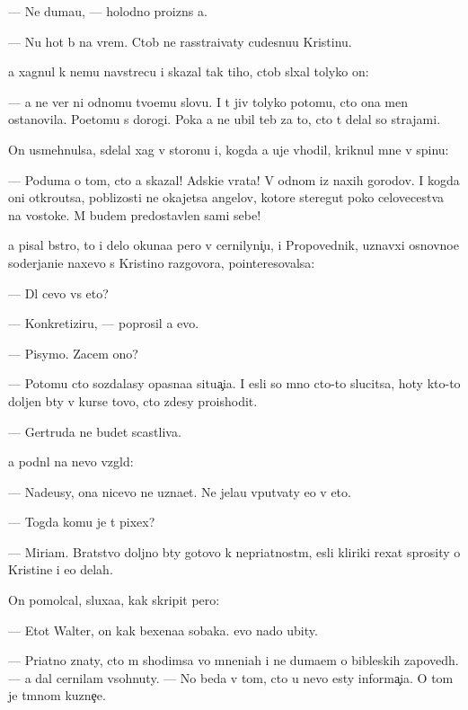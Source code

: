 \documentclass[10pt]{book}
\begin{document}
— Ne duma{\y}u, — holodno proizn{\e}s {\y}a.

— Nu hot{\ia} b{\yi} na vrem{\ia}. Ctob{\yi} ne rasstra{\y}ivaty cudesnu{\y}u Kristinu.

{\Y}a xagnul k nemu navstrecu i skazal tak tiho, ctob{\yi} sl{\yi}xal tolyko on:

— {\Y}a ne ver{\iu} ni odnomu tvo{\y}emu slovu. I t{\yi} jiv tolyko potomu, cto ona men{\ia} ostanovila. Poetomu s dorogi. Poka {\y}a ne ubil teb{\ia} za to, cto t{\yi} delal so strajami.

On usmehnulsa, sdelal xag v storonu i, kogda {\y}a uje v{\yi}hodil, kriknul mne v spinu:

— Poduma{\y} o tom, cto {\y}a skazal! Adski{\y}e vrata! V odnom iz naxih gorodov. I kogda oni otkro{\y}utsa, poblizosti ne okajetsa angelov, kotor{\yi}{\y}e steregut poko{\y} celovecestva na vostoke. M{\yi} budem predostavlen{\yi} sami sebe!



{\Y}a pisal b{\yi}stro, to i delo okuna{\y}a pero v cernilyni{\c}u, i Propovednik, uznavxi{\y} osnovno{\y}e soderjani{\y}e naxevo s Kristino{\y} razgovora, pointeresovalsa:

— Dl{\ia} cevo vs{\e} eto?

— Konkretiziru{\y}, — poprosil {\y}a {\y}evo.

— Pisymo. Zacem ono?

— Potomu cto sozdalasy opasna{\y}a situa{\c}i{\y}a. I {\y}esli so mno{\y} cto-to slucitsa, hoty kto-to doljen b{\yi}ty v kurse tovo, cto zdesy proishodit.

— Gertruda ne budet scastliva.

{\Y}a podn{\ia}l na nevo vzgl{\ia}d:

— Nade{\y}usy, ona nicevo ne uzna{\y}et. Ne jela{\y}u vput{\yi}vaty {\y}e{\y}o v eto.

— Togda komu je t{\yi} pixex?

— Miriam. Bratstvo doljno b{\yi}ty gotovo k nepri{\y}atnost{\ia}m, {\y}esli kliriki rexat sprosity o Kristine i {\y}e{\y}o delah.

On pomolcal, sluxa{\y}a, kak skripit pero:

— Etot Walter, on kak bexena{\y}a sobaka. {\Y}evo nado ubity.

— Pri{\y}atno znaty, cto m{\yi} shodimsa vo mneni{\y}ah i ne duma{\y}em o bible{\y}skih zapoved{\ia}h. — {\Y}a dal cernilam v{\yi}sohnuty. — No beda v tom, cto u nevo {\y}esty informa{\c}i{\y}a. O tom je t{\e}mnom kuzne{\c}e.
\end{document}
